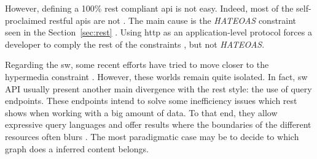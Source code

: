 However, defining a 100\% \ac{rest} compliant \ac{api} is not easy.
Indeed, most of the self-proclaimed \ac{rest}ful \acp{api} are not \citep{house_how_2012}. %
The main cause is the \emph{HATEOAS} constraint seen in the Section~\ref{sec:rest} \citep{fielding_rest_2008}.
Using \ac{http} as an application-level protocol forces a developer to comply the rest of the constraints \citet{moore_hypermedia_2010}, but not \emph{HATEOAS}.


Regarding the \ac{sw}, some recent efforts have tried to move closer to the \ac{hypermedia} constraint \citep{steiner_fulfilling_2011,kjernsmo_necessity_2012}.
However, these worlds remain quite isolated.
In fact, \ac{sw} API  usually present another main divergence with the \ac{rest} style: the use of query endpoints.
These endpoints intend to solve some inefficiency issues which \ac{rest} shows when working with a big amount of data. %
To that end, they allow expressive query languages and offer results where the boundaries of the different resources often blurs \citep{wilde_restful_2009}.
The most paradigmatic case may be to decide to which graph does a inferred content belongs. %






